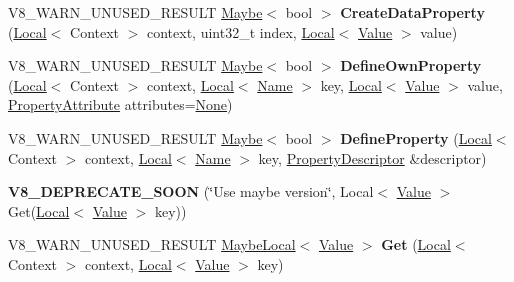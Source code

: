 \begin{DoxyCompactItemize}
\item 
\mbox{\label{classv8_1_1Object_aec3a99813837c0bc6444c59f8e5ca22a}} 
V8\+\_\+\+W\+A\+R\+N\+\_\+\+U\+N\+U\+S\+E\+D\+\_\+\+R\+E\+S\+U\+LT \mbox{\hyperlink{classv8_1_1Maybe}{Maybe}}$<$ bool $>$ {\bfseries Create\+Data\+Property} (\mbox{\hyperlink{classv8_1_1Local}{Local}}$<$ Context $>$ context, uint32\+\_\+t index, \mbox{\hyperlink{classv8_1_1Local}{Local}}$<$ \mbox{\hyperlink{classv8_1_1Value}{Value}} $>$ value)
\item 
\mbox{\label{classv8_1_1Object_a65f44f92b7ee9d479ce6b3ebb9ac8d4b}} 
V8\+\_\+\+W\+A\+R\+N\+\_\+\+U\+N\+U\+S\+E\+D\+\_\+\+R\+E\+S\+U\+LT \mbox{\hyperlink{classv8_1_1Maybe}{Maybe}}$<$ bool $>$ {\bfseries Define\+Own\+Property} (\mbox{\hyperlink{classv8_1_1Local}{Local}}$<$ Context $>$ context, \mbox{\hyperlink{classv8_1_1Local}{Local}}$<$ \mbox{\hyperlink{classv8_1_1Name}{Name}} $>$ key, \mbox{\hyperlink{classv8_1_1Local}{Local}}$<$ \mbox{\hyperlink{classv8_1_1Value}{Value}} $>$ value, \mbox{\hyperlink{namespacev8_a05f25f935e108a1ea2d150e274602b87}{Property\+Attribute}} attributes=\mbox{\hyperlink{namespacev8_a05f25f935e108a1ea2d150e274602b87a7ab4d58719c33b3ea2dfaefa29b111df}{None}})
\item 
\mbox{\label{classv8_1_1Object_a45a9be0638554ca4f6049b7cf094fcd4}} 
V8\+\_\+\+W\+A\+R\+N\+\_\+\+U\+N\+U\+S\+E\+D\+\_\+\+R\+E\+S\+U\+LT \mbox{\hyperlink{classv8_1_1Maybe}{Maybe}}$<$ bool $>$ {\bfseries Define\+Property} (\mbox{\hyperlink{classv8_1_1Local}{Local}}$<$ Context $>$ context, \mbox{\hyperlink{classv8_1_1Local}{Local}}$<$ \mbox{\hyperlink{classv8_1_1Name}{Name}} $>$ key, \mbox{\hyperlink{classv8_1_1PropertyDescriptor}{Property\+Descriptor}} \&descriptor)
\item 
\mbox{\label{classv8_1_1Object_a15c40cda73a1927bef406b85032d5564}} 
{\bfseries V8\+\_\+\+D\+E\+P\+R\+E\+C\+A\+T\+E\+\_\+\+S\+O\+ON} (\char`\"{}Use maybe version\char`\"{}, Local$<$ \mbox{\hyperlink{classv8_1_1Value}{Value}} $>$ Get(\mbox{\hyperlink{classv8_1_1Local}{Local}}$<$ \mbox{\hyperlink{classv8_1_1Value}{Value}} $>$ key))
\item 
\mbox{\label{classv8_1_1Object_a239c03bb250cd6bf583ca60f72e18918}} 
V8\+\_\+\+W\+A\+R\+N\+\_\+\+U\+N\+U\+S\+E\+D\+\_\+\+R\+E\+S\+U\+LT \mbox{\hyperlink{classv8_1_1MaybeLocal}{Maybe\+Local}}$<$ \mbox{\hyperlink{classv8_1_1Value}{Value}} $>$ {\bfseries Get} (\mbox{\hyperlink{classv8_1_1Local}{Local}}$<$ Context $>$ context, \mbox{\hyperlink{classv8_1_1Local}{Local}}$<$ \mbox{\hyperlink{classv8_1_1Value}{Value}} $>$ key)

\end{DoxyCompactItemize}
